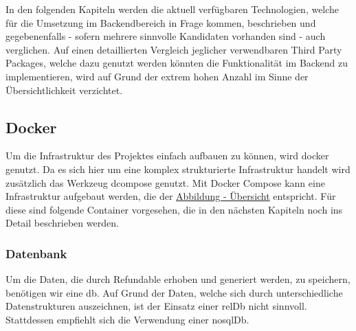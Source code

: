 	\newpage
	In den folgenden Kapiteln werden die aktuell verfügbaren Technologien, welche für die Umsetzung im Backendbereich in Frage kommen, beschrieben und gegebenenfalls - sofern mehrere sinnvolle Kandidaten vorhanden sind - auch verglichen. Auf einen detaillierten Vergleich jeglicher verwendbaren Third Party Packages, welche dazu genutzt werden könnten die Funktionalität im Backend zu implementieren, wird auf Grund der extrem hohen Anzahl im Sinne der Übersichtlichkeit verzichtet.
	\subsection{Docker}
	Um die Infrastruktur des Projektes einfach aufbauen zu können, wird \Gls{docker} genutzt. Da es sich hier um eine komplex strukturierte Infrastruktur handelt wird zusätzlich das Werkzeug \Gls{dcompose} genutzt. Mit Docker Compose kann eine Infrastruktur aufgebaut werden, die der \hyperref[fig:uebersicht]{Abbildung - Übersicht} entspricht. Für diese sind folgende Container vorgesehen, die in den nächsten Kapiteln noch ins Detail beschrieben werden.
		\subsubsection{Datenbank}
		Um die Daten, die durch Refundable erhoben und generiert werden, zu speichern, benötigen wir eine \gls{db}. Auf Grund der Daten, welche sich durch unterschiedliche Datenstrukturen auszeichnen, ist der Einsatz einer \gls{relDb} nicht sinnvoll. Stattdessen empfiehlt sich die Verwendung einer \gls{nosqlDb}.
		

